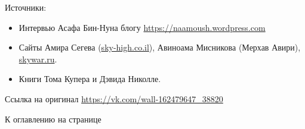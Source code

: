 
Источники:

\begin{itemize}
	\item Интервью Асафа Бин-Нуна блогу \url{https://naamoush.wordpress.com}

\item Сайты Амира Сегева (\url{sky-high.co.il}), Авиноама Мисникова (Мерхав Авири), \url{skywar.ru}.

\item Книги Тома Купера и Дэвида Николле.
\end{itemize}

Ссылка на оригинал \url{https://vk.com/wall-162479647_38820}

К оглавлению на странице \pageref{tablecont}